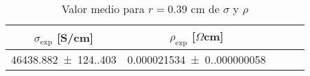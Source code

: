 \begin{table}[H]
    \centering
\begin{tabular}{ccccc}
\toprule
$\sigma_{\exp}$ [S/cm] & $\rho_{\exp}$ [$\Omega$cm] \\
\midrule
\num{46438.882(124.403)} & \num{0.000021534(0.000000058)} \\
\bottomrule
\end{tabular}
    \caption{Valor medio para $r=0.39$ cm de $\sigma$ y $\rho $}
    \label{Tab:S4}
\end{table}
